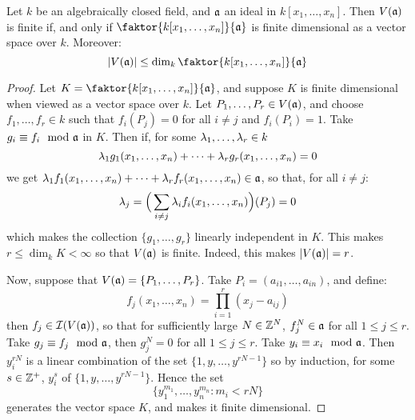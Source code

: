 \begin{proposition}\label{proposition_10.5.3}
  Let $k$ be an algebraically closed field, and $\mathfrak{a}$ an ideal in
  $k[x_1, \dots, x_n]$. Then $V(\mathfrak{a})$ is finite if, and only if
  $\faktor{k[x_1, \dots, x_n]}{\af}$ is finite dimensional as a
  vector space over $k$. Moreover:
  \begin{equation*}
    |V(\af)| \leq \dim_k{\faktor{k[x_1, \dots, x_n]}{\af}}
  \end{equation*}
\end{proposition}
\begin{proof}
  Let $K=\faktor{k[x_1, \dots, x_n]}{\af}$, and suppose $K$ is finite
  dimensional when viewed as a vector space over $k$. Let $P_1, \dots,
  P_r \in V(\mathfrak{a})$, and choose $f_1, \dots, f_r \in k$ such that
  $f_i(P_j)=0$ for all $i \neq j$ and $f_i(P_i)=1$. Take $g_i \equiv
  f_i \mod{\mathfrak{a}}$ in $K$. Then if, for some $\lambda_1, \dots, \lambda_r \in k$
  \begin{equation*}
    \lambda_1g_1(x_1, \dots, x_n)+\dots+\lambda_rg_r(x_1, \dots, x_n)=0
  \end{equation*}
  we get $\lambda_1f_1(x_1, \dots, x_n)+\dots+\lambda_rf_r(x_1, \dots, x_n) \in \mathfrak{a}$,
  so that, for all $i \neq j$:
  \begin{equation*}
    \lambda_j = \Big{(} \sum_{i \neq j}{\lambda_if_i(x_1, \dots, x_n)} \Big{)}(P_j)=0
  \end{equation*}
  which makes the collection $\{g_1, \dots, g_r\}$ linearly
  independent in $K$. This makes $r \leq \dim_k{K}<\infty$ so that
  $V(\mathfrak{a})$ is finite. Indeed, this makes $|V(\mathfrak{a})|=r$.

  Now, suppose that $V(\mathfrak{a})=\{P_1, \dots, P_r\}$. Take $P_i=(a_{i1},
  \dots, a_{in})$, and define:
  \begin{equation*}
    f_j(x_1, \dots, x_n)=\prod_{i=1}^r{(x_j-a_{ij})}
  \end{equation*}
  then $f_j \in \mathcal{I}(V(\mathfrak{a}))$, so that for sufficiently large $N \in
  \mathbb{Z}^N$, $f_j^N \in \mathfrak{a}$ for all $1 \leq j \leq r$. Take $g_j \equiv
  f_j \mod{\mathfrak{a}}$, then $g_j^N=0$ for all $1 \leq j \leq r$. Take $y_i
  \equiv x_i \mod{\mathfrak{a}}$. Then $y_i^{rN}$ is a linear combination of
  the set $\{1, y, \dots, y^{rN-1}\}$ so by induction, for some $s \in
  \mathbb{Z}^+$, $y_i^s$ of $\{1, y, \dots, y^{rN-1}\}$. Hence the set
  \begin{equation*}
    \{y_1^{m_1}, \dots, y_n^{m_n} : m_i < rN\}
  \end{equation*}
  generates the vector space $K$, and makes it finite dimensional.
\end{proof}
